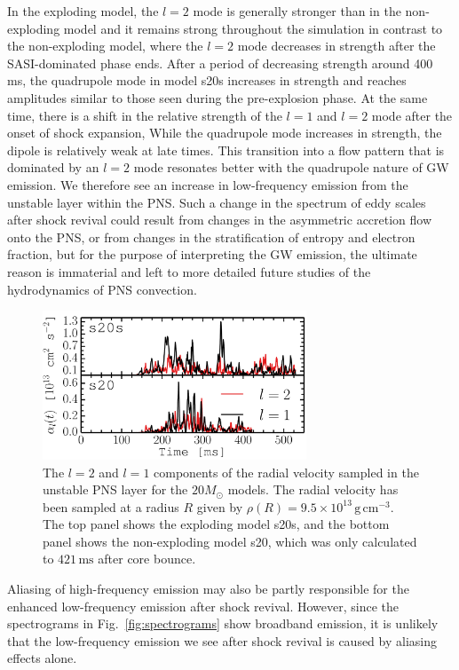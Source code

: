 In the exploding model, the $l=2$ mode is generally stronger than in the non-exploding model and
it remains strong throughout the simulation in contrast to the non-exploding model,
where the $l=2$ mode decreases in strength after the SASI-dominated phase ends.
After a period of decreasing strength around 400 ms, the quadrupole mode in model s20s increases in 
strength and reaches amplitudes similar to those seen during the pre-explosion phase.
At the same time, there is a shift in the relative 
strength of the $l=1$ and $l=2$ mode after the onset of shock expansion,
While the quadrupole mode increases in strength, the dipole is relatively weak at late times.
This transition into a flow pattern that is dominated by an $l=2$ mode resonates better with the
quadrupole nature of GW emission. We therefore see an increase in low-frequency emission
from the unstable layer within the PNS.
Such a change in the spectrum of eddy scales after shock revival
could result from changes in the asymmetric accretion flow onto
the PNS, or from changes in the stratification of entropy and electron
fraction, but for the purpose of interpreting the GW
emission, the ultimate reason is immaterial and left to more detailed future studies of the
hydrodynamics of PNS convection.
\begin{figure}
\centering
\includegraphics[width=0.7\textwidth]{./images/paper1/fig14.pdf}
\caption{The $l=2$ and $l=1$ components of the radial
velocity sampled in the unstable PNS layer for the $20 M_\odot$ models. The radial velocity has been sampled
at a radius $R$ given by $\rho(R) = 9.5 \times 10^{13}\, \mathrm{g} \, \mathrm{cm}^{-3}$.  The top panel
shows the exploding model s20s, and the bottom panel shows the non-exploding model s20, which was only calculated to $421 \, \mathrm{ms}$ after core bounce.
\label{fig:al2}
}
\end{figure}
Aliasing of high-frequency emission may also be partly responsible for the enhanced low-frequency emission after shock revival. However,
since the spectrograms in Fig.~\ref{fig:spectrograms} show broadband emission, it is unlikely that the low-frequency emission we see 
after shock revival is caused by aliasing effects alone. 

